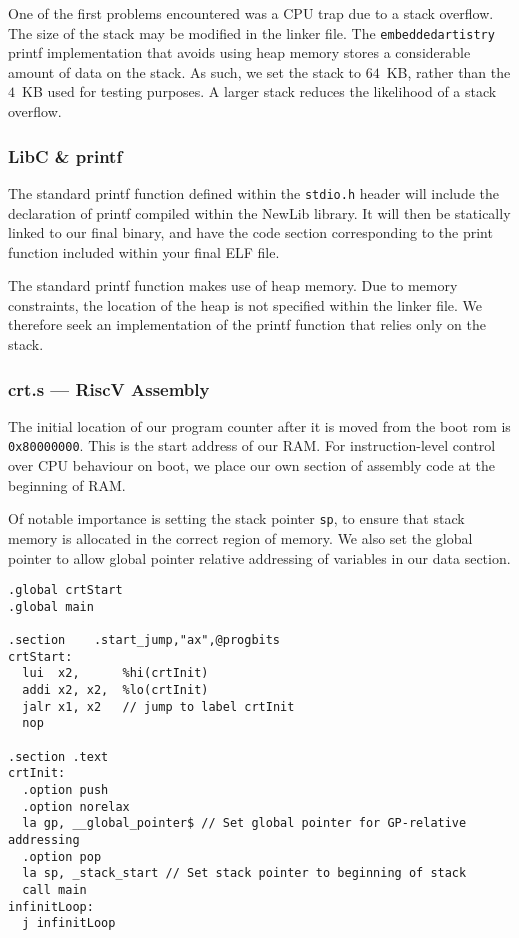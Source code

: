 \documentclass[a4paper,8pt]{report}
\begin{document}
One of the first problems encountered was a CPU trap due to a stack overflow.
The size of the stack may be modified in the linker file. The \texttt{embeddedartistry}
printf implementation that avoids using heap memory stores a considerable amount
of data on the stack. As such, we set the stack to $64$~KB, rather than the
$4$~KB used for testing purposes. A larger stack reduces the likelihood of a
stack overflow.

\subsubsection{LibC \& printf}
The standard printf function defined within the \texttt{stdio.h} header will
include the declaration of printf compiled within the NewLib library. It will
then be statically linked to our final binary, and have the code section
corresponding to the print function included within your final ELF file.

The standard printf function makes use of heap memory. Due to memory
constraints, the location of the heap is not specified within the linker file.
We therefore seek an implementation of the printf function that relies only on
the stack. 

\subsubsection{crt.s --- RiscV Assembly}
The initial location of our program counter after it is moved from the boot rom
is \texttt{0x80000000}. This is the start address of our RAM. For
instruction-level control over CPU behaviour on boot, we place our own section
of assembly code at the beginning of RAM.

Of notable importance is setting the stack pointer \texttt{sp}, to ensure that
stack memory is allocated in the correct region of memory. We also set the
global pointer to allow global pointer relative addressing of variables in our
data section.


\lstset{language=[RISC-V]Assembler}
\begin{lstlisting}
.global crtStart
.global main

.section	.start_jump,"ax",@progbits
crtStart:
  lui  x2,      %hi(crtInit)
  addi x2, x2,  %lo(crtInit)
  jalr x1, x2   // jump to label crtInit
  nop

.section .text
crtInit:
  .option push
  .option norelax
  la gp, __global_pointer$ // Set global pointer for GP-relative addressing
  .option pop
  la sp, _stack_start // Set stack pointer to beginning of stack
  call main
infinitLoop:
  j infinitLoop

\end{lstlisting}
\lstset{}
\end{document}
